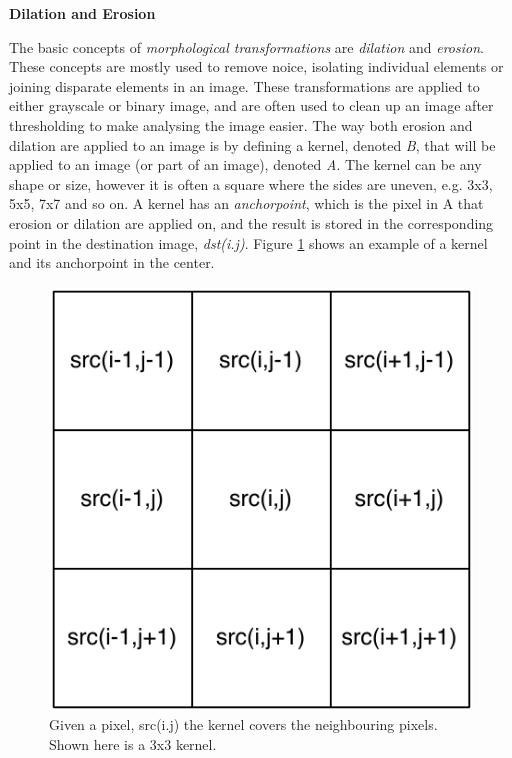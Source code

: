 \noindent \textbf{Dilation and Erosion} \par

The basic concepts of \textit{morphological transformations} are \textit{dilation} and \textit{erosion}. These concepts are mostly used to remove noice, isolating individual elements or joining disparate elements in an image. These transformations are applied to either grayscale or binary image, and are often used to clean up an image after thresholding to make analysing the image easier. The way both erosion and dilation are applied to an image is by defining a kernel, denoted \textit{B}, that will be applied to an image (or part of an image), denoted \textit{A}. The kernel can be any shape or size, however it is often a square where the sides are uneven, e.g. 3x3, 5x5, 7x7 and so on. A kernel has an \textit{anchorpoint}, which is the pixel in A that erosion or dilation are applied on, and the result is stored in the corresponding point in the destination image, \textit{dst(i.j)}. Figure \ref{fig:kernel_ed} shows an example of a kernel and its anchorpoint in the center. \\

\begin{figure}[ht!]
  \centering
    \includegraphics[scale=0.50]{img/Kernel_ED.pdf}
  \caption{Given a pixel, src(i.j) the kernel covers the neighbouring pixels. Shown here is a 3x3 kernel.}
  \label{fig:kernel_ed}
\end{figure}

